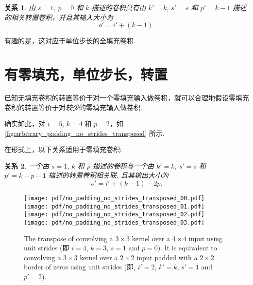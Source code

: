 \documentclass[notitlepage]{ctexrep}
\newtheorem{relationship}{关系}
\begin{document}
\begin{relationship}\label{rel:no_padding_no_strides_transposed}
由 $s = 1$, $p = 0$ 和 $k$ 描述的卷积具有由 $k' = k$, $s' = s$ 和 $p' = k - 1$ 描述的相关转置卷积，并且其输入大小为 
\begin{equation*}
    o' = i' + (k - 1).
\end{equation*}
\end{relationship}

有趣的是，这对应于单位步长的全填充卷积.

\section{有零填充，单位步长，转置}

已知无填充卷积的转置等价于对一个零填充输入做卷积，就可以合理地假设零填充卷积的转置等价于对{\em 较少}的零填充输入做卷积.

确实如此，对 $i = 5$, $k = 4$ 和 $p = 2$，如 \autoref{fig:arbitrary_padding_no_strides_transposed} 所示.

在形式上，以下关系适用于零填充卷积:

\begin{relationship}\label{rel:arbitrary_padding_no_strides_transposed}
一个由 $s = 1$, $k$ 和 $p$ 描述的卷积与一个由 $k' = k$, $s' = s$ 和 $p' = k -
p - 1$ 描述的转置卷积相关联. 且其输出大小为
\begin{equation*}
    o' = i' + (k - 1) - 2p.
\end{equation*}
\end{relationship}

\begin{figure}[p]
    \centering
    \texttt{[image: pdf/no\_padding\_no\_strides\_transposed\_00.pdf]}
    \texttt{[image: pdf/no\_padding\_no\_strides\_transposed\_01.pdf]}
    \texttt{[image: pdf/no\_padding\_no\_strides\_transposed\_02.pdf]}
    \texttt{[image: pdf/no\_padding\_no\_strides\_transposed\_03.pdf]}
    \caption{\label{fig:no_padding_no_strides_transposed} The transpose of
        convolving a $3 \times 3$ kernel over a $4 \times 4$ input using unit
        strides (即 $i = 4$, $k = 3$, $s = 1$ and $p = 0$). It is equivalent
        to convolving a $3 \times 3$ kernel over a $2 \times 2$ input padded
        with a $2 \times 2$ border of zeros using unit strides (即, $i' = 2$,
        $k' = k$, $s' = 1$ and $p' = 2$).}
\end{figure}
\end{document}

